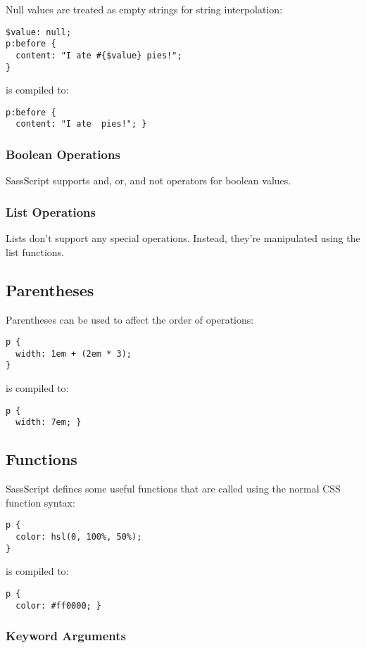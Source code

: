 \documentclass[9pt]{article}
\begin{document}
 Null values are treated as empty strings for string interpolation:
\begin{verbatim}
$value: null;
p:before {
  content: "I ate #{$value} pies!";
}
\end{verbatim}


 is compiled to:
\begin{verbatim}
p:before {
  content: "I ate  pies!"; }
\end{verbatim}
\subsubsection{Boolean Operations}


 SassScript supports and, or, and not operators for boolean values.
\subsubsection{List Operations}


 Lists don’t support any special operations. Instead, they’re manipulated using the list functions.
\subsection{Parentheses}


 Parentheses can be used to affect the order of operations:
\begin{verbatim}
p {
  width: 1em + (2em * 3);
}
\end{verbatim}


 is compiled to:
\begin{verbatim}
p {
  width: 7em; }
\end{verbatim}
\subsection{Functions}


 SassScript defines some useful functions that are called using the normal CSS function syntax:
\begin{verbatim}
p {
  color: hsl(0, 100%, 50%);
}
\end{verbatim}


 is compiled to:
\begin{verbatim}
p {
  color: #ff0000; }
\end{verbatim}
\subsubsection{Keyword Arguments}
\end{document}
